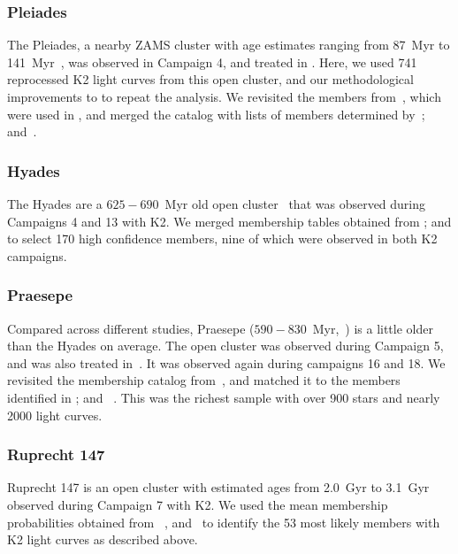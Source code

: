 \documentclass{aa}
\begin{document}
\subsubsection{Pleiades}
The Pleiades, a nearby ZAMS cluster with age estimates ranging from 87~Myr to 141~Myr~\citep{bell_pre-main-sequence_2012, scholz2015, dahm_reexamining_2015, yen2018, gossage2018, bossini2019}, was observed in Campaign 4, and treated in . Here, we used 741 reprocessed K2 light curves from this open cluster, and our methodological improvements to  to repeat the analysis. We revisited the members from~\citet{rebull_pleiadesrot_2016}, which were used in , and merged the catalog with lists of members determined by~\citet{olivares_pleiades_2018, gaia_dr2_2018_hrd}; and~\citet{cantat_gaudin_2018}.
\subsubsection{Hyades}
The Hyades are a $625-690$~Myr old open cluster~\citep{perryman1998,salaris_age_2004, gossage2018, gaia_dr2_2018_hrd} that was observed during Campaigns 4 and 13 with K2.  We merged membership tables obtained from \citet{douglas_praesepe_hyades_2014, reino_hyades_2018}; and \citet{gaia_dr2_2018_hrd} to select 170 high confidence members, nine of which were observed in both K2 campaigns. 
\subsubsection{Praesepe}
Compared across different studies, Praesepe ($590-830$~Myr,~\citealt{salaris_age_2004, boudreault_astrometric_2012, scholz2015, yen2018, gossage2018, bossini2019}) is a little older than the Hyades on average. The open cluster was observed during Campaign 5, and was also treated in~. It was observed again during campaigns 16 and 18. We revisited the membership catalog from~\citet{douglas_praesepe_hyades_2014}, and matched it to the members identified in \citet{douglas_poking_2017, rebull_praesepe_2017,cantat_gaudin_2018}; and ~\citet{gaia_dr2_2018_hrd}. This was the richest sample with over 900 stars and nearly 2000 light curves.
\subsubsection{Ruprecht 147}
Ruprecht 147 is an open cluster with estimated ages from 2.0~Gyr to 3.1~Gyr~\citep{curtis2013,scholz2015,gaia_dr2_2018_hrd,torres2018} observed during Campaign 7 with K2. We used the mean membership probabilities obtained from ~\citet{curtis2013, cantat_gaudin_2018, olivares_ngc6774_2019}, and~\citet{gaia_dr2_2018_hrd} to identify the 53 most likely members with K2 light curves as described above.
\end{document}

